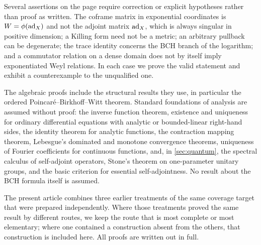 Several assertions on the page require correction or explicit hypotheses
rather than proof as written. The coframe matrix in exponential coordinates
is $W=\phi(\operatorname{ad}_X)$ and not the adjoint matrix $\operatorname{ad}_X$, which is always
singular in positive dimension; a Killing form need not be a metric; an
arbitrary pullback can be degenerate; the trace identity concerns the BCH
branch of the logarithm; and a commutator relation on a dense domain does not
by itself imply exponentiated Weyl relations. In each case we prove the valid
statement and exhibit a counterexample to the unqualified one.

The algebraic proofs include the structural results they use, in
particular the ordered Poincar\'e--Birkhoff--Witt theorem. Standard
foundations of analysis are assumed without proof: the inverse function
theorem, existence and uniqueness for ordinary differential equations with
analytic or bounded-linear right-hand sides, the identity theorem for
analytic functions, the contraction mapping theorem, Lebesgue's dominated
and monotone convergence theorems, uniqueness of Fourier coefficients for
continuous functions, and, in \cref{sec:quantum}, the spectral calculus of
self-adjoint operators, Stone's theorem on one-parameter unitary groups,
and the basic criterion for essential self-adjointness. No result about
the BCH formula itself is assumed.

The present article combines three earlier treatments of the same coverage
target that were prepared independently. Where those treatments proved the
same result by different routes, we keep the route that is most complete or
most elementary; where one contained a construction absent from the others,
that construction is included here. All proofs are written out in full.

